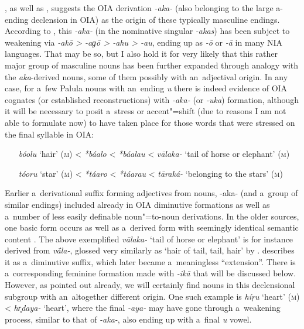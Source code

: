 \citet[15]{morgenstierne1941}, as well as \citet[29]{buddruss1967}, suggests the OIA derivation \textit{-aka-} (also belonging to the large a-ending declension in OIA) as the origin of these typically masculine endings. According to \citet[222]{masica1991}, this \textit{-aka-} (in the nominative singular \textit{-akas}) has been subject to weakening via \textit{-akō {\textgreater} -aɡō {\textgreater} -ahu {\textgreater} -au}, ending up as \textit{-ō} or \textit{-\={a}} in many NIA languages. That may be so, but I also hold it for very likely that this rather major group of masculine nouns has been further expanded through analogy with the \textit{aka}-derived nouns, some of them possibly with an~adjectival origin. In any case, for a~few Palula nouns with an~ending \textit{u} there is indeed evidence of OIA cognates (or established reconstructions) with \textit{-aka-} (or \textit{-uka}) formation, although it will be necessary to posit a~stress or accent"=shift (due to reasons I am not able to formulate now) to have taken place for those words that were stressed on the final syllable in OIA: 

\begin{itemize}[itemsep=0pt, leftmargin=]
\item[\textit{bóolu} `hair' (\textsc{m})] {\textless} \textit{*báalo} {\textless} \textit{*báalau} {\textless} \textit{vālaka-} `tail of horse or elephant' (\textsc{m})
\item[\textit{tóoru} `star' (\textsc{m})] {\textless} \textit{*táaro} {\textless} \textit{*táarau} {\textless} \textit{tāraká-} `belonging to the stars' (\textsc{m})
\end{itemize}

Earlier a~derivational suffix forming adjectives from nouns, -aka- (and a~group of similar endings) included already in OIA diminutive formations as well as a~number of less easily definable noun"=to-noun derivations. In the older sources, one basic form occurs as well as a~derived form with seemingly identical semantic content \citep[1222]{whitney1960}. The above exemplified \textit{vālaka-} `tail of horse or elephant' is for instance derived from \textit{v\'{\={a}}la-}, glossed very similarly as `hair of tail, tail, hair' by \citet[12056]{turner1966}. \citet[222]{masica1991} describes it as a~diminutive suffix, which later became a~meaningless ``extension''. There is a~corresponding \citep[1181, 1222]{whitney1960} feminine formation made with \textit{-ikā} that will be discussed below. However, as pointed out already, we will certainly find nouns in this declensional subgroup with an~altogether different origin. One such example is \textit{híṛu} `heart' (\textsc{m}) {\textless} \textit{hr̥daya-} `heart', where the final \textit{-aya-} may have gone through a~weakening process, similar to that of \textit{-aka-}, also ending up with a~final \textit{u} vowel.



